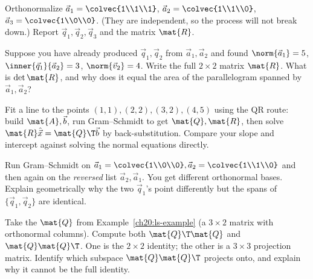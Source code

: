 \begin{exercise}
Orthonormalize
$\vec{a}_1=\colvec{1\\1\\1}$, $\vec{a}_2=\colvec{1\\1\\0}$, $\vec{a}_3=\colvec{1\\0\\0}$.
(They are independent, so the process will not break down.) Report
$\vec{q}_1,\vec{q}_2,\vec{q}_3$ and the matrix $\mat{R}$.
\end{exercise}

\begin{exercise}
Suppose you have already produced $\vec{q}_1,\vec{q}_2$ from $\vec{a}_1,\vec{a}_2$ and
found $\norm{\vec{a}_1}=5$, $\inner{\vec{q}_1}{\vec{a}_2}=3$, $\norm{\vec{v}_2}=4$.
Write the full $2\times 2$ matrix $\mat{R}$. What is $\det\mat{R}$, and why does it
equal the area of the parallelogram spanned by $\vec{a}_1,\vec{a}_2$?
\end{exercise}

\begin{exercise}
Fit a line to the points $(1,1),(2,2),(3,2),(4,5)$ using the QR route: build
$\mat{A},\vec{b}$, run Gram--Schmidt to get $\mat{Q},\mat{R}$, then solve
$\mat{R}\hat{\vec{x}}=\mat{Q}\T\vec{b}$ by back-substitution. Compare your slope and
intercept against solving the normal equations directly.
\end{exercise}

\begin{exercise}
Run Gram--Schmidt on $\vec{a}_1=\colvec{1\\0\\0},\vec{a}_2=\colvec{1\\1\\0}$ and then
again on the \emph{reversed} list $\vec{a}_2,\vec{a}_1$. You get different orthonormal
bases. Explain geometrically why the two $\vec{q}_1$'s point differently but the spans
of $\{\vec{q}_1,\vec{q}_2\}$ are identical.
\end{exercise}

\begin{exercise}[Why $\mat{Q}\T\mat{Q}=\mat{I}$ but $\mat{Q}\mat{Q}\T\neq\mat{I}$]
Take the $\mat{Q}$ from Example~\ref{ch20:ls-example} (a $3\times 2$ matrix with
orthonormal columns). Compute both $\mat{Q}\T\mat{Q}$ and $\mat{Q}\mat{Q}\T$. One is
the $2\times 2$ identity; the other is a $3\times 3$ projection matrix. Identify which
subspace $\mat{Q}\mat{Q}\T$ projects onto, and explain why it cannot be the full
identity.
\end{exercise}

